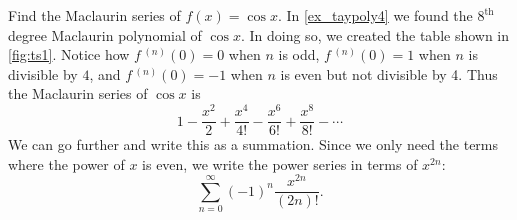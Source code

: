 \begin{example}[The Maclaurin series of $f(x) = \cos x$]\label{ex_ts1}%
Find the Maclaurin series of $f(x)=\cos x$.
\solution
In \autoref{ex_taypoly4} we found the $8^\text{th}$ degree Maclaurin polynomial of $\cos x$. In doing so, we created the table shown in \autoref{fig:ts1}.
%
%
Notice how $f\,^{(n)}(0)=0$ when $n$ is odd,  $f\,^{(n)}(0)=1$ when $n$ is divisible by $4$, and $f\,^{(n)}(0)=-1$ when $n$ is even but not divisible by 4. Thus the Maclaurin series of $\cos x$ is
\[1-\frac{x^2}2+\frac{x^4}{4!}-\frac{x^6}{6!}+\frac{x^8}{8!} - \dotsb\]
We can go further and write this as a summation. Since we only need the terms where the power of $x$ is even, we write the power series in terms of $x^{2n}$:
\[\sum_{n=0}^\infty (-1)^{n}\frac{x^{2n}}{(2n)!}.\]
\end{example}

